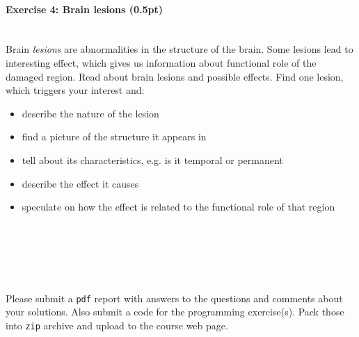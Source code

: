 \documentclass[a4paper,11pt]{article}
\newenvironment{exercise}[3]{\paragraph{Exercise #1: #2 (#3pt)}\ \\}{
\medskip}
\begin{document}
\begin{exercise}{4}{Brain lesions}{0.5}
Brain \emph{lesions} are abnormalities in the structure of the brain. Some lesions lead to interesting effect, which gives us information about functional role of the damaged region. Read about brain lesions and possible effects. Find one lesion, which triggers your interest and:
\begin{itemize}
\itemsep 0em
	\item describe the nature of the lesion
	\item find a picture of the structure it appears in
	\item tell about its characteristics, e.g. is it temporal or permanent
	\item describe the effect it causes
	\item speculate on how the effect is related to the functional role of that region
\end{itemize}
\end{exercise}

\ \\
\ \\
\ \\
\ \\
\ \\
Please submit a \texttt{pdf} report with answers to the questions and comments about your solutions. Also submit a code for the programming exercise(s). Pack those into \texttt{zip} archive and upload to the course web page.
\end{document}
